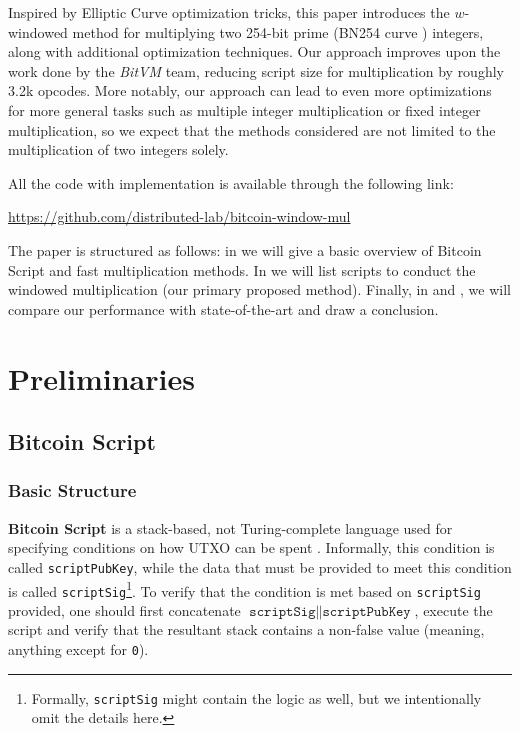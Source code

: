 \documentclass{iacrtrans}
\begin{document}
Inspired by Elliptic Curve optimization tricks, this paper introduces the $w$-windowed method for multiplying two 254-bit prime (BN254 curve \cite{bn254}) integers, along with additional optimization techniques. Our approach improves upon the work done by the \textit{BitVM} team, reducing script size for multiplication by roughly \textsf{3.2k opcodes}. More notably, our approach can lead to even more optimizations for more general tasks such as multiple integer multiplication or fixed integer multiplication, so we expect that the methods considered are not limited to the multiplication of two integers solely.

All the code with implementation is available through the following link:
\begin{center}
    \url{https://github.com/distributed-lab/bitcoin-window-mul}
\end{center}
The paper is structured as follows: in  we will give a basic overview of Bitcoin Script and fast multiplication methods. In  we will list scripts to conduct the windowed multiplication (our primary proposed method). Finally, in  and , we will compare our performance with state-of-the-art and draw a conclusion.

\section{Preliminaries}\label{section:preliminaries}

\subsection{Bitcoin Script}

\subsubsection{Basic Structure}
\textbf{Bitcoin Script} is a stack-based, not Turing-complete language used for specifying conditions on how UTXO can be spent \cite{mastering_bitcoin}. Informally, this condition is called \texttt{scriptPubKey}, while the data that must be provided to meet this condition is called \texttt{scriptSig}\footnote{Formally, \texttt{scriptSig} might contain the logic as well, but we intentionally omit the details here.}. To verify that the condition is met based on \texttt{scriptSig} provided, one should first concatenate $\texttt{scriptSig} \parallel \texttt{scriptPubKey}$, execute the script and verify that the resultant stack contains a non-false value (meaning, anything except for \texttt{0}). 
\end{document}

